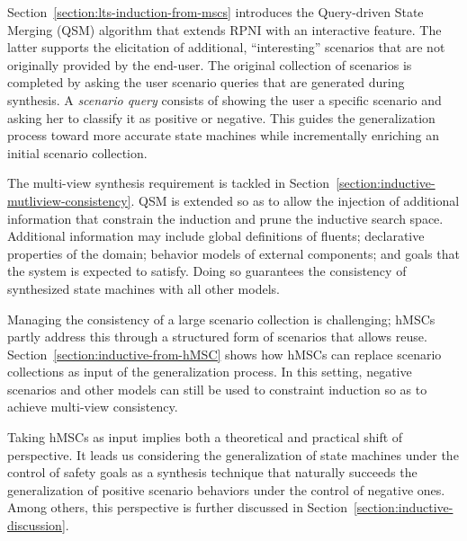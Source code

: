 Section~\ref{section:lts-induction-from-mscs} introduces the Query-driven State Merging (QSM) algorithm that extends RPNI with an interactive feature. The latter supports the elicitation of additional, ``interesting'' scenarios that are not originally provided by the end-user. The original collection of scenarios is completed by asking the user scenario queries that are generated during synthesis. A \emph{scenario query} consists of showing the user a specific scenario and asking her to classify it as positive or negative. This guides the generalization process toward more accurate state machines while incrementally enriching an initial scenario collection.

The multi-view synthesis requirement is tackled in Section~\ref{section:inductive-mutliview-consistency}. QSM is extended so as to allow the injection of additional information that constrain the induction and prune the inductive search space. Additional information may include global definitions of fluents; declarative properties of the domain; behavior models of external components; and goals that the system is expected to satisfy. Doing so guarantees the consistency of synthesized state machines with all other models.

Managing the consistency of a large scenario collection is challenging; hMSCs partly address this through a structured form of scenarios that allows reuse. Section~\ref{section:inductive-from-hMSC} shows how hMSCs can replace scenario collections as input of the generalization process. In this setting, negative scenarios and other models can still be used to constraint induction so as to achieve multi-view consistency. 

Taking hMSCs as input implies both a theoretical and practical shift of perspective. It leads us considering the generalization of state machines under the control of safety goals as a synthesis technique that naturally succeeds the generalization of positive scenario behaviors under the control of negative ones. Among others, this perspective is further discussed in Section~\ref{section:inductive-discussion}.
